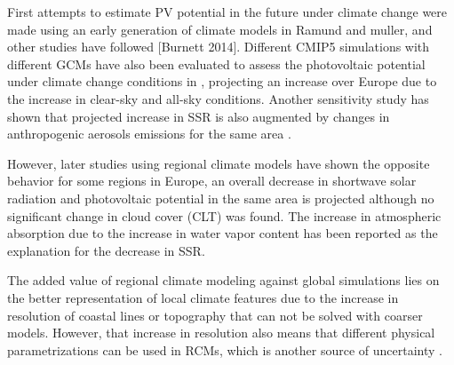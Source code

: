 
First attempts to estimate PV potential in the future under climate change were made using an early generation of climate models in Ramund and muller, and other studies have followed \cite*{Crook2011, panagea2014, Gaetani2014} [Burnett 2014]. Different CMIP5 simulations with different GCMs have also been evaluated to assess the photovoltaic potential under climate change conditions in \cite*{Wild2015}, projecting an increase over Europe due to the increase in clear-sky and all-sky conditions. Another sensitivity study has shown that projected increase in SSR is also augmented by changes in anthropogenic aerosols emissions for the same area \cite*{Gaetani2014}.

However, later studies using regional climate models \cite*{Jerez2015, Bartok2017} have shown the opposite behavior for some regions in Europe, an overall decrease in shortwave solar radiation and photovoltaic potential in the same area is projected although no significant change in cloud cover (CLT) was found. The increase in atmospheric absorption due to the increase in water vapor content has been reported as the explanation for the decrease in SSR.
   
   The added value of regional climate modeling against global simulations lies on the better representation of local climate features due to the increase in resolution of coastal lines or topography that can not be solved with coarser models. However, that increase in resolution also means that different physical parametrizations can be used in RCMs, which is another source of uncertainty \cite*{Bartok2017}.



